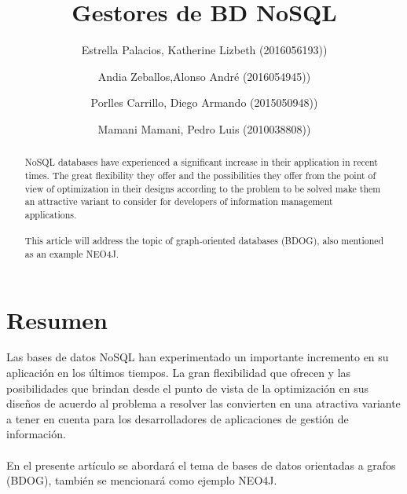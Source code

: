 \documentclass[preprint,12pt]{elsarticle}
\begin{document}
	
	\begin{frontmatter} 

		\title{\huge Gestores de BD NoSQL}
		
		\author{Estrella Palacios, Katherine Lizbeth      (2016056193))}
		\author{Andia Zeballos,Alonso André           	(2016054945))}
		\author{Porlles Carrillo, Diego Armando	         	(2015050948))}  
		\author{Mamani Mamani, Pedro Luis                 (2010038808))} 
		\address{Escuela Profesional de Ingeniería de Sistemas}
		\address{Universidad Privada de Tacna}
		\address{Tacna, Perú}
		

		\begin{abstract}
		
NoSQL databases have experienced a significant increase in their application in recent times. The great flexibility they offer and the possibilities they offer from the point of view of optimization in their designs according to the problem to be solved make them an attractive variant to consider for developers of information management applications. \\ \\ This article will address the topic of graph-oriented databases (BDOG), also mentioned as an example NEO4J.

		\end{abstract}


	\end{frontmatter}


\section{Resumen}

Las bases de datos NoSQL han experimentado un importante incremento en su aplicación en los últimos tiempos. La gran flexibilidad que ofrecen y las posibilidades que brindan desde el punto de vista de la optimización en sus diseños de acuerdo al problema a resolver las convierten en una atractiva variante a tener en cuenta para los desarrolladores de aplicaciones de gestión de información.\\ \\  En el presente artículo se abordará el tema de bases de datos orientadas a grafos (BDOG), también se mencionará como ejemplo NEO4J.
\end{document}
